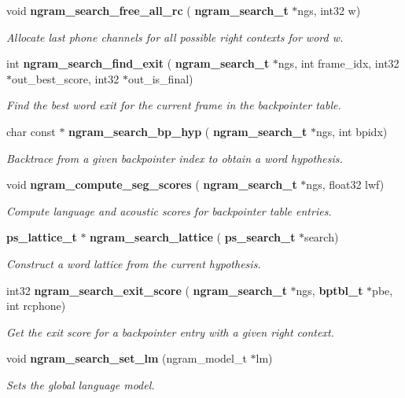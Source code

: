 \begin{DoxyCompactItemize}
\mbox{\label{ngram__search_8h_a15477192481dffcb29e9c4167eff6c3c}} 
void \textbf{ ngram\+\_\+search\+\_\+free\+\_\+all\+\_\+rc} (\textbf{ ngram\+\_\+search\+\_\+t} $\ast$ngs, int32 w)
\begin{DoxyCompactList}\small\item\em Allocate last phone channels for all possible right contexts for word w. \end{DoxyCompactList}\item 
int \textbf{ ngram\+\_\+search\+\_\+find\+\_\+exit} (\textbf{ ngram\+\_\+search\+\_\+t} $\ast$ngs, int frame\+\_\+idx, int32 $\ast$out\+\_\+best\+\_\+score, int32 $\ast$out\+\_\+is\+\_\+final)
\begin{DoxyCompactList}\small\item\em Find the best word exit for the current frame in the backpointer table. \end{DoxyCompactList}\item 
char const  $\ast$ \textbf{ ngram\+\_\+search\+\_\+bp\+\_\+hyp} (\textbf{ ngram\+\_\+search\+\_\+t} $\ast$ngs, int bpidx)
\begin{DoxyCompactList}\small\item\em Backtrace from a given backpointer index to obtain a word hypothesis. \end{DoxyCompactList}\item 
\mbox{\label{ngram__search_8h_a2fa760c99f77eb075157304f4359941e}} 
void \textbf{ ngram\+\_\+compute\+\_\+seg\+\_\+scores} (\textbf{ ngram\+\_\+search\+\_\+t} $\ast$ngs, float32 lwf)
\begin{DoxyCompactList}\small\item\em Compute language and acoustic scores for backpointer table entries. \end{DoxyCompactList}\item 
\mbox{\label{ngram__search_8h_ac30e7dec4bbfeee9f5163abf4bbd1014}} 
\textbf{ ps\+\_\+lattice\+\_\+t} $\ast$ \textbf{ ngram\+\_\+search\+\_\+lattice} (\textbf{ ps\+\_\+search\+\_\+t} $\ast$search)
\begin{DoxyCompactList}\small\item\em Construct a word lattice from the current hypothesis. \end{DoxyCompactList}\item 
\mbox{\label{ngram__search_8h_a25a80e488425b2bd4e24eb753c9295a5}} 
int32 \textbf{ ngram\+\_\+search\+\_\+exit\+\_\+score} (\textbf{ ngram\+\_\+search\+\_\+t} $\ast$ngs, \textbf{ bptbl\+\_\+t} $\ast$pbe, int rcphone)
\begin{DoxyCompactList}\small\item\em Get the exit score for a backpointer entry with a given right context. \end{DoxyCompactList}\item 
void \textbf{ ngram\+\_\+search\+\_\+set\+\_\+lm} (ngram\+\_\+model\+\_\+t $\ast$lm)
\begin{DoxyCompactList}\small\item\em Sets the global language model. \end{DoxyCompactList}\end{DoxyCompactItemize}


